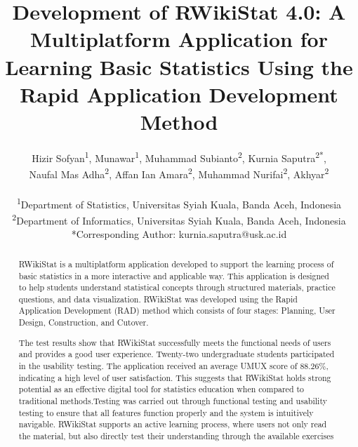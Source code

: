 \documentclass[conference,a4paper]{IEEEtran}
\begin{document}
\title{
  Development of RWikiStat 4.0: A Multiplatform Application for Learning Basic Statistics Using the Rapid Application Development Method \\
}

\makeatletter
\newcommand{\linebreakand}{
  \end{@IEEEauthorhalign}
  \hfill\mbox{}\par
  \mbox{}\hfill\begin{@IEEEauthorhalign}
}
\makeatother

\author{
  Hizir Sofyan\textsuperscript{1}, Munawar\textsuperscript{1}, Muhammad Subianto\textsuperscript{2}, Kurnia Saputra\textsuperscript{2*},\\
  Naufal Mas Adha\textsuperscript{2}, Affan Ian Amara\textsuperscript{2}, Muhammad Nurifai\textsuperscript{2}, Akhyar\textsuperscript{2}\\
  \\
  \textsuperscript{1}Department of Statistics, Universitas Syiah Kuala, Banda Aceh, Indonesia\\
  \textsuperscript{2}Department of Informatics, Universitas Syiah Kuala, Banda Aceh, Indonesia\\
  *Corresponding Author: kurnia.saputra@usk.ac.id
}

\maketitle

\begin{abstract}
  RWikiStat is a multiplatform application developed to support the learning process of basic statistics in a more interactive and applicable way. This application is designed to help students understand statistical concepts through structured materials, practice questions, and data visualization. RWikiStat was developed using the Rapid Application Development (RAD) method which consists of four stages: Planning, User Design, Construction, and Cutover.

  The test results show that RWikiStat successfully meets the functional needs of users and provides a good user experience. Twenty-two undergraduate students participated in the usability testing. The application received an average UMUX score of 88.26\%, indicating a high level of user satisfaction. This suggests that RWikiStat holds strong potential as an effective digital tool for statistics education when compared to traditional methods.Testing was carried out through functional testing and usability testing to ensure that all features function properly and the system is intuitively navigable. RWikiStat supports an active learning process, where users not only read the material, but also directly test their understanding through the available exercises

\end{abstract}
\end{document}

